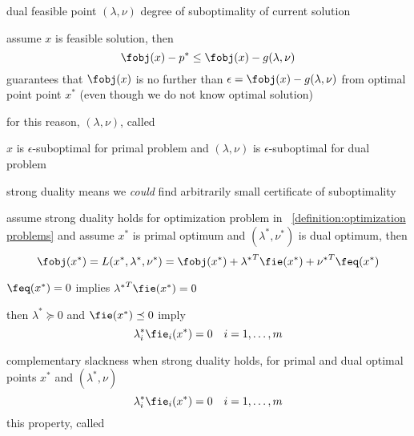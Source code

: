 \documentclass[17pt,landscape]{foils}
\begin{document}
{\bit
\item
	dual feasible point $(\lambda,\nu)$
	degree of suboptimality of current solution

\vitem
	assume $x$ is feasible solution,
	then
	$$
		\fobj(x) - p^\ast \leq \fobj(x) - g(\lambda,\nu)
	$$
	guarantees that $\fobj(x)$ is no further than $\epsilon = \fobj(x) - g(\lambda,\nu)$
	from optimal point point $x^\ast$
	(even though we do not know optimal solution)

\vitem
	for this reason,
	$(\lambda,\nu)$, called 

\vitem
	$x$ is $\epsilon$-suboptimal for primal problem
	and
	$(\lambda,\nu)$ is $\epsilon$-suboptimal for dual problem

\vitem
	strong duality means we \emph{could}
	find arbitrarily small certificate of suboptimality
\eit
\vfill



\bit
\item
	assume strong duality holds for optimization problem
	in ~\ref{definition:optimization problems}
	and assume $x^\ast$ is primal optimum and $(\lambda^\ast,\nu^\ast)$ is dual optimum,
	then
	$$
		\fobj(x^\ast)
		= L(x^\ast,\lambda^\ast,\nu^\ast)
		= \fobj(x^\ast) + {\lambda^\ast}^T \fie(x^\ast) + {\nu^\ast}^T \feq(x^\ast)
	$$

\vitem
	$\feq(x^\ast)=0$ implies ${\lambda^\ast}^T \fie(x^\ast)=0$

\vitem
	then $\lambda^\ast \succeq 0$ and $\fie(x^\ast) \preceq 0$ imply
	$$
		\lambda_i^\ast \fie_i(x^\ast) = 0
		\quad
		i=1,\ldots,m
	$$
\eit

\begin{myproposition}{complementary slackness}
	when strong duality holds,
	for primal and dual optimal points $x^\ast$ and $(\lambda^\ast, \nu)$
	$$
		\lambda_i^\ast \fie_i(x^\ast) = 0
		\quad
		i=1,\ldots,m
	$$
	this property, called 
\end{myproposition}
\vfill



}
\end{document}

